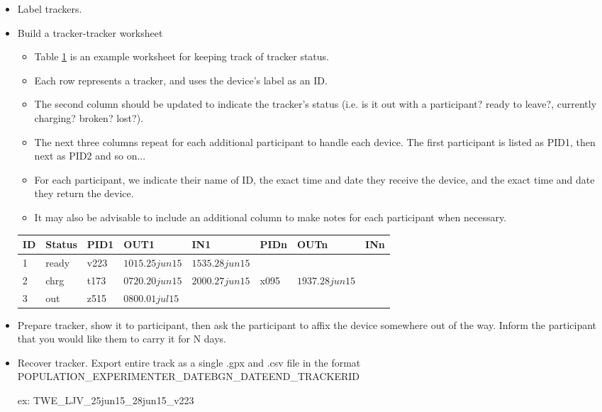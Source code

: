 \documentclass[idxtotoc,hyperref,openany]{labbook} %
\begin{document}
\begin{itemize}

\item Label trackers.

\item Build a tracker-tracker worksheet

	\begin{itemize}
	\item Table \ref{tab:tracktrack} is an example worksheet for keeping track of tracker status.
	\item Each row represents a tracker, and uses the device's label as an ID.
	\item The second column should be updated to indicate the tracker's status (i.e. is it out with a participant? ready to leave?, currently charging? broken? lost?).
	\item The next three columns repeat for each additional participant to handle each device.  The first participant is listed as PID1, then next as PID2 and so on...
	\item For each participant, we indicate their name of ID, the exact time and date they receive the device, and the exact time and date they return the device.
	\item It may also be advisable to include an additional column to make notes for each participant when necessary.
	\end{itemize}

\begin{table}[H]
\begin{tabular}{l l l l l l l l}
\toprule
\textbf{ID} & \textbf{Status} & \textbf{PID1}  & \textbf{OUT1}  & \textbf{IN1} & \textbf{PIDn}  & \textbf{OUTn}  & \textbf{INn}\\
\toprule
1 & ready & v223 & $1015.25jun15$ & $1535.28jun15$ & & & \\
2 & chrg & t173 & $0720.20jun15$ & $2000.27jun15$ & x095 & $1937.28jun15$ & \\
3 & out & z515 & $0800.01jul15$ & & & \\
\bottomrule
\end{tabular}
\label{tab:tracktrack}
\end{table}

\item Prepare tracker, show it to participant, then ask the participant to affix the device somewhere out of the way.  Inform the participant that you would like them to carry it for N days.

\item Recover tracker. Export entire track as a single .gpx and .csv file in the format POPULATION\_EXPERIMENTER\_DATEBGN\_DATEEND\_TRACKERID  

ex: TWE\_LJV\_25jun15\_28jun15\_v223

\end{itemize}
\end{document}
